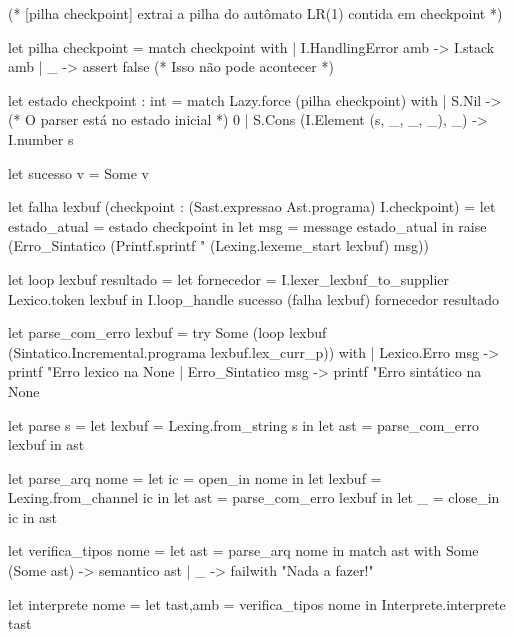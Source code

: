 \documentclass[12pt,a4paper,twoside]{article}
\begin{document}
\begin{terminal}
(* [pilha checkpoint] extrai a pilha do autômato LR(1) contida em checkpoint *)

let pilha checkpoint =
  match checkpoint with
  | I.HandlingError amb -> I.stack amb
  | _ -> assert false (* Isso não pode acontecer *)

let estado checkpoint : int =
  match Lazy.force (pilha checkpoint) with
  | S.Nil -> (* O parser está no estado inicial *)
     0
  | S.Cons (I.Element (s, _, _, _), _) ->
     I.number s

let sucesso v = Some v

let falha lexbuf (checkpoint : (Sast.expressao Ast.programa) I.checkpoint) =
  let estado_atual = estado checkpoint in
  let msg = message estado_atual in
  raise (Erro_Sintatico (Printf.sprintf "%
                                      (Lexing.lexeme_start lexbuf) msg))

let loop lexbuf resultado =
  let fornecedor = I.lexer_lexbuf_to_supplier Lexico.token lexbuf in
  I.loop_handle sucesso (falha lexbuf) fornecedor resultado


let parse_com_erro lexbuf =
  try
    Some (loop lexbuf (Sintatico.Incremental.programa lexbuf.lex_curr_p))
  with
  | Lexico.Erro msg ->
     printf "Erro lexico na %
     None
  | Erro_Sintatico msg ->
     printf "Erro sintático na %
     None

let parse s =
  let lexbuf = Lexing.from_string s in
  let ast = parse_com_erro lexbuf in
  ast

let parse_arq nome =
  let ic = open_in nome in
  let lexbuf = Lexing.from_channel ic in
  let ast = parse_com_erro lexbuf in
  let _ = close_in ic in
  ast

let verifica_tipos nome =
  let ast = parse_arq nome in
  match ast with
    Some (Some ast) -> semantico ast
  | _ -> failwith "Nada a fazer!\n"


let interprete nome =
  let tast,amb = verifica_tipos nome in
  Interprete.interprete tast
\end{terminal}
\end{document}

